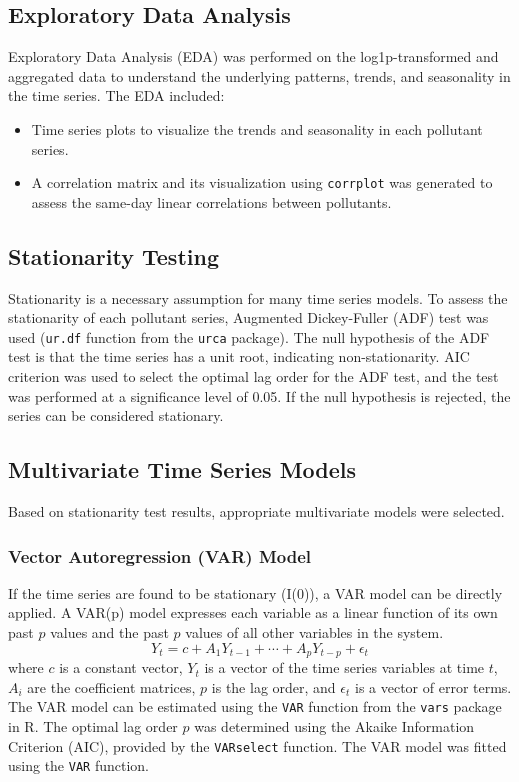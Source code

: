 \documentclass[fleqn,10pt]{SelfArx} %
\begin{document}
\subsection{Exploratory Data Analysis}
Exploratory Data Analysis (EDA) was performed on the log1p-transformed and aggregated data to understand the underlying patterns, trends, and seasonality in the time series. The EDA included:
\begin{itemize}
    \item Time series plots to visualize the trends and seasonality in each pollutant series.
    \item A correlation matrix and its visualization using \texttt{corrplot} was generated to assess the same-day linear correlations between pollutants.
\end{itemize}

\subsection{Stationarity Testing}
Stationarity is a necessary assumption for many time series models. To assess the stationarity of each pollutant series, Augmented Dickey-Fuller (ADF) test was used (\texttt{ur.df} function from the \texttt{urca} package). The null hypothesis of the ADF test is that the time series has a unit root, indicating non-stationarity. AIC criterion was used to select the optimal lag order for the ADF test, and the test was performed at a significance level of 0.05. If the null hypothesis is rejected, the series can be considered stationary.

\subsection{Multivariate Time Series Models}
Based on stationarity test results, appropriate multivariate models were selected.
\subsubsection{Vector Autoregression (VAR) Model}
If the time series are found to be stationary (I(0)), a VAR model can be directly applied. A VAR(p) model expresses each variable as a linear function of its own past $p$ values and the past $p$ values of all other variables in the system.
\begin{equation}
Y_t = c + A_1 Y_{t-1} + \cdots + A_p Y_{t-p} + \epsilon_t
\end{equation}
where \(c\) is a constant vector, \(Y_t\) is a vector of the time series variables at time \(t\), \(A_i\) are the coefficient matrices, \(p\) is the lag order, and \(\epsilon_t\) is a vector of error terms.
The VAR model can be estimated using the \texttt{VAR} function from the \texttt{vars} package in R. The optimal lag order $p$ was determined using the Akaike Information Criterion (AIC), provided by the \texttt{VARselect} function. The VAR model was fitted using the \texttt{VAR} function.
\end{document}
